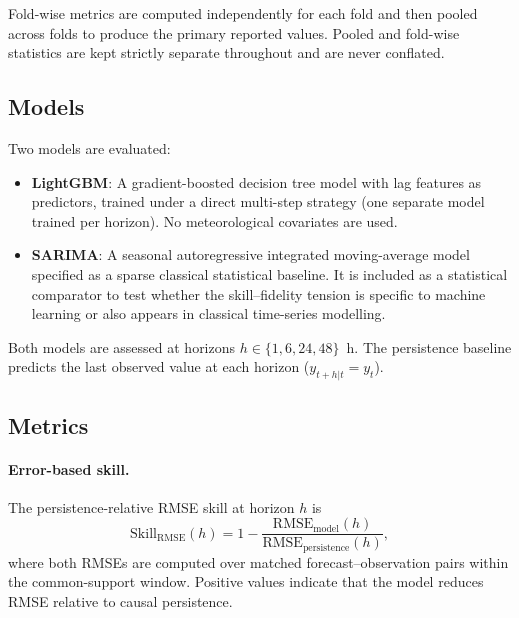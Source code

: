 \documentclass[12pt]{article}
\begin{document}
Fold-wise metrics are computed independently for each fold and then pooled across folds to produce the primary reported values. Pooled and fold-wise statistics are kept strictly separate throughout and are never conflated.

\subsection{Models}
\label{sec:models}

Two models are evaluated:
\begin{itemize}
\item \textbf{LightGBM}: A gradient-boosted decision tree model with lag features as predictors, trained under a direct multi-step strategy (one separate model trained per horizon). No meteorological covariates are used.
\item \textbf{SARIMA}: A seasonal autoregressive integrated moving-average model specified as a sparse classical statistical baseline. It is included as a statistical comparator to test whether the skill--fidelity tension is specific to machine learning or also appears in classical time-series modelling.
\end{itemize}

Both models are assessed at horizons $h \in \{1, 6, 24, 48\}$~h. The persistence baseline predicts the last observed value at each horizon ($y_{t+h|t} = y_t$).

\subsection{Metrics}
\label{sec:metrics}

\paragraph{Error-based skill.}
The persistence-relative RMSE skill at horizon $h$ is
\begin{equation}
  \label{eq:skill_rmse}
  \mathrm{Skill}_\mathrm{RMSE}(h)
    = 1 - \frac{\mathrm{RMSE}_\mathrm{model}(h)}{\mathrm{RMSE}_\mathrm{persistence}(h)},
\end{equation}
where both RMSEs are computed over matched forecast--observation pairs within the common-support window. Positive values indicate that the model reduces RMSE relative to causal persistence.
\end{document}
